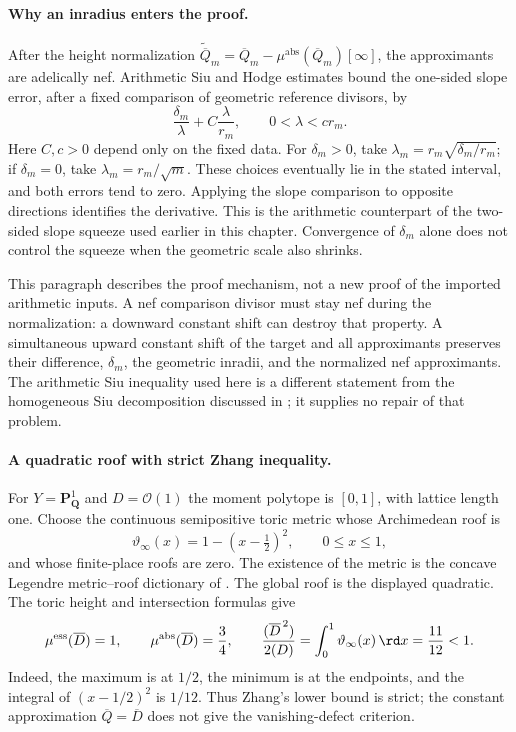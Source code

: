 \paragraph{Why an inradius enters the proof.}
After the height normalization
$\widetilde{\overline Q}_m=\overline Q_m-
\mu^{\mathrm{abs}}(\overline Q_m)[\infty]$, the approximants are
adelically nef. Arithmetic Siu and Hodge estimates bound the
one-sided slope error, after a fixed comparison of geometric
reference divisors, by
\[
                  \frac{\delta_m}{\lambda}
                     +C\frac{\lambda}{r_m},\qquad
                          0<\lambda<c r_m.
\]
Here $C,c>0$ depend only on the fixed data.
For $\delta_m>0$, take
$\lambda_m=r_m\sqrt{\delta_m/r_m}$; if $\delta_m=0$, take
$\lambda_m=r_m/\sqrt m$. These choices eventually lie in the stated interval, and both errors
tend to zero. Applying the
slope comparison to opposite directions identifies the derivative.
This is the arithmetic counterpart of the two-sided slope squeeze
used earlier in this chapter. Convergence of $\delta_m$ alone does
not control the squeeze when the geometric scale also shrinks.

This paragraph describes the proof mechanism, not a new proof of
the imported arithmetic inputs. A nef comparison divisor must stay
nef during the normalization: a downward constant shift can destroy
that property. A simultaneous upward constant shift of the target
and all approximants preserves their difference, $\delta_m$, the
geometric inradii, and the normalized nef approximants.
The arithmetic Siu inequality used here is a different statement
from the homogeneous Siu decomposition discussed in
; it supplies no repair of that problem.

\paragraph{A quadratic roof with strict Zhang inequality.}
For $Y=\mathbf P^1_{\mathbf Q}$ and $D=\mathcal O(1)$ the moment
polytope is $[0,1]$, with lattice length one. Choose the continuous
semipositive toric metric whose Archimedean roof is
\[
                 \vartheta_\infty(x)=1-(x-\tfrac12)^2,
                        \qquad 0\leq x\leq1,
\]
and whose finite-place roofs are zero. The existence of the metric
is the concave Legendre metric--roof dictionary of
\cite[Section~8.1]{BallaySombra26Published}.
The global roof is the displayed quadratic. The toric height and
intersection formulas give
\[
 \mu^{\mathrm{ess}}(\overline D)=1,\qquad
 \mu^{\mathrm{abs}}(\overline D)=\frac34,\qquad
 \frac{(\overline D^{\,2})}{2(D)}
       =\int_0^1\vartheta_\infty(x)\,\rd x
       =\frac{11}{12}<1.
\]
Indeed, the maximum is at $1/2$, the minimum is at the endpoints,
and the integral of $(x-1/2)^2$ is $1/12$.
Thus Zhang's lower bound is strict; the constant approximation
$\overline Q=\overline D$ does not give the vanishing-defect
criterion.

